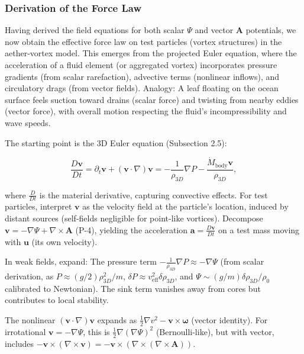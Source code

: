 \documentclass{article}
\begin{document}
\subsubsection{Derivation of the Force Law}

Having derived the field equations for both scalar $\Psi$ and vector $\mathbf{A}$ potentials, we now obtain the effective force law on test particles (vortex structures) in the aether-vortex model. This emerges from the projected Euler equation, where the acceleration of a fluid element (or aggregated vortex) incorporates pressure gradients (from scalar rarefaction), advective terms (nonlinear inflows), and circulatory drags (from vector fields). Analogy: A leaf floating on the ocean surface feels suction toward drains (scalar force) and twisting from nearby eddies (vector force), with overall motion respecting the fluid's incompressibility and wave speeds.

The starting point is the 3D Euler equation (Subsection 2.5):

\[
\frac{D \mathbf{v}}{Dt} = \partial_t \mathbf{v} + (\mathbf{v} \cdot \nabla) \mathbf{v} = -\frac{1}{\rho_{3D}} \nabla P - \frac{\dot{M}_{\text{body}} \mathbf{v}}{\rho_{3D}},
\]

where $\frac{D}{Dt}$ is the material derivative, capturing convective effects. For test particles, interpret $\mathbf{v}$ as the velocity field at the particle's location, induced by distant sources (self-fields negligible for point-like vortices). Decompose $\mathbf{v} = -\nabla \Psi + \nabla \times \mathbf{A}$ (P-4), yielding the acceleration $\mathbf{a} = \frac{D \mathbf{v}}{Dt}$ on a test mass moving with $\mathbf{u}$ (its own velocity).

In weak fields, expand: The pressure term $-\frac{1}{\rho_{3D}} \nabla P \approx - \nabla \Psi$ (from scalar derivation, as $P \approx (g / 2) \rho_{3D}^2 / m$, $\delta P \approx v_{\text{eff}}^2 \delta \rho_{3D}$, and $\Psi \sim (g / m) \delta \rho_{3D} / \rho_0$ calibrated to Newtonian). The sink term vanishes away from cores but contributes to local stability.

The nonlinear $(\mathbf{v} \cdot \nabla) \mathbf{v}$ expands as $\frac{1}{2} \nabla v^2 - \mathbf{v} \times \boldsymbol{\omega}$ (vector identity). For irrotational $\mathbf{v} = -\nabla \Psi$, this is $\frac{1}{2} \nabla (\nabla \Psi)^2$ (Bernoulli-like), but with vector, includes $- \mathbf{v} \times (\nabla \times \mathbf{v}) = - \mathbf{v} \times (\nabla \times (\nabla \times \mathbf{A}))$.
\end{document}
